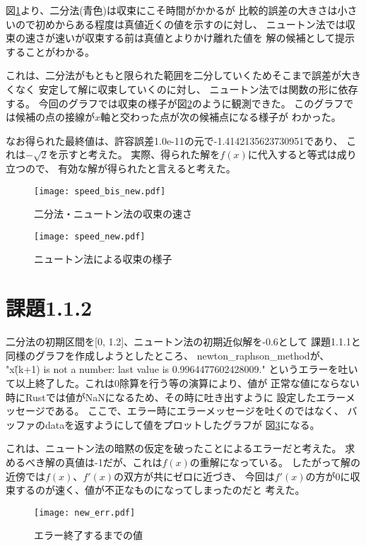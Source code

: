 \documentclass[uplatex, 11pt,a4j, titlepage]{jsarticle}
\begin{document}
図\ref{bis_new}より、二分法(青色)は収束にこそ時間がかかるが
比較的誤差の大きさは小さいので初めからある程度は真値近くの値を示すのに対し、
ニュートン法では収束の速さが速いが収束する前は真値とよりかけ離れた値を
解の候補として提示することがわかる。

これは、二分法がもともと限られた範囲を二分していくためそこまで誤差が大きくなく
安定して解に収束していくのに対し、
ニュートン法では関数の形に依存する。
今回のグラフでは収束の様子が図\ref{new}のように観測できた。
このグラフでは候補の点の接線が$x$軸と交わった点が次の候補点になる様子が
わかった。

なお得られた最終値は、許容誤差1.0e-11の元で-1.4142135623730951であり、
これは$-\sqrt{2}$を示すと考えた。
実際、得られた解を$f(x)$に代入すると等式は成り立つので、
有効な解が得られたと言えると考えた。

\begin{figure}[h]
    \centering
    \texttt{[image: speed\_bis\_new.pdf]}
    \caption{二分法・ニュートン法の収束の速さ}
    \label{bis_new}
\end{figure}

\begin{figure}[h]
    \centering
    \texttt{[image: speed\_new.pdf]}
    \caption{ニュートン法による収束の様子}
    \label{new}
\end{figure}

\newpage
\newpage

\section{課題1.1.2}

二分法の初期区間を[0, 1.2]、ニュートン法の初期近似解を-0.6として
課題1.1.1と同様のグラフを作成しようとしたところ、
newton\_raphson\_methodが、
"x\^(k+1) is not a number: last value is 0.9964477602428009."
というエラーを吐いて以上終了した。これは0除算を行う等の演算により、値が
正常な値にならない時にRustでは値がNaNになるため、その時に吐き出すように
設定したエラーメッセージである。
ここで、エラー時にエラーメッセージを吐くのではなく、
バッファのdataを返すようにして値をプロットしたグラフが
図\ref{new_err}になる。

これは、ニュートン法の暗黙の仮定を破ったことによるエラーだと考えた。
求めるべき解の真値は-1だが、これは$f(x)$の重解になっている。
したがって解の近傍では$f(x)$、$f'(x)$の双方が共にゼロに近づき、
今回は$f'(x)$の方が0に収束するのが速く、値が不正なものになってしまったのだと
考えた。

\newpage
\begin{figure}[h]
    \centering
    \texttt{[image: new\_err.pdf]}
    \caption{エラー終了するまでの値}
    \label{new_err}
\end{figure}
\end{document}
